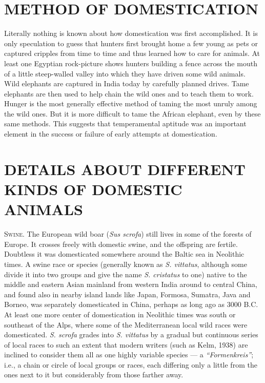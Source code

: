 \section*{METHOD OF DOMESTICATION}

Literally nothing is known about how domestication was first accomplished. It is only speculation to guess that
hunters first brought home a few young as pets or captured cripples from time to time and thus learned how to
care for animals. At least one Egyptian rock-picture shows hunters building a fence across the mouth of a little
steep-walled valley into which they have driven some wild animals. Wild elephants are captured in India today by
carefully planned drives. Tame elephants are then used to help chain the wild ones and to teach them to work.
Hunger is the most generally effective method of taming the most unruly among the wild ones. But it is more
difficult to tame the African elephant, even by these same methods. This suggests that temperamental aptitude
was an important element in the success or failure of early attempts at domestication.

\section*{DETAILS ABOUT DIFFERENT KINDS OF DOMESTIC ANIMALS}

\textsc{Swine}. The European wild boar (\textit{Sus scrofa}) still lives in some of the forests of Europe. It
crosses freely with domestic swine, and the offspring are fertile. Doubtless it was domesticated somewhere around
the Baltic sea in Neolithic times. A swine race or species (generally known as \textit{S. vittatus}, although
some divide it into two groups and give the name \textit{S. cristatus} to one) native to the middle and eastern
Asian mainland from western India around to central China, and found also in nearby island lands like Japan,
Formosa, Sumatra, Java and Borneo, was separately domesticated in China, perhaps as long ago as 3000 B.C. At
least one more center of domestication in Neolithic times was south or southeast of the Alps, where some of the
Mediterranean local wild races were domesticated. \textit{S. scrofa} grades into \textit{S. vittatus} by a
gradual but continuous series of local races to such an extent that modern writers (such as Kelm, 1938) are
inclined to consider them all as one highly variable species --- a \textit{``Formenkreis''}; i.e., a chain or
circle of local groups or races, each differing only a little from the ones next to it but considerably from
those farther away.

